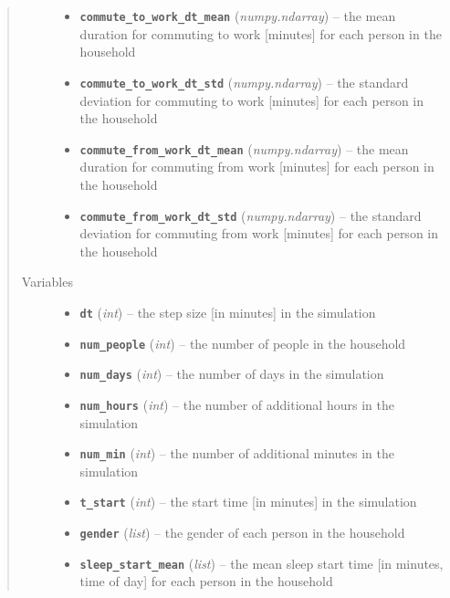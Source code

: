 \documentclass[letterpaper,10pt,english]{sphinxmanual}
\begin{document}
\begin{fulllineitems}
\begin{quote}
\begin{description}
\begin{itemize}
\item {} 
\textbf{\texttt{commute\_to\_work\_dt\_mean}} (\emph{numpy.ndarray}) -- the mean duration for commuting to work {[}minutes{]} for each     person in the household

\item {} 
\textbf{\texttt{commute\_to\_work\_dt\_std}} (\emph{numpy.ndarray}) -- the standard deviation for commuting to work {[}minutes{]} for each     person in the household

\item {} 
\textbf{\texttt{commute\_from\_work\_dt\_mean}} (\emph{numpy.ndarray}) -- the mean duration for commuting from work {[}minutes{]} for each     person in the household

\item {} 
\textbf{\texttt{commute\_from\_work\_dt\_std}} (\emph{numpy.ndarray}) -- the standard deviation for commuting from work {[}minutes{]} for     each person in the household

\end{itemize}

\item[{Variables}] \leavevmode\begin{itemize}
\item {} 
\textbf{\texttt{dt}} (\emph{int}) -- the step size {[}in minutes{]} in the simulation

\item {} 
\textbf{\texttt{num\_people}} (\emph{int}) -- the number of people in the household

\item {} 
\textbf{\texttt{num\_days}} (\emph{int}) -- the number of days in the simulation

\item {} 
\textbf{\texttt{num\_hours}} (\emph{int}) -- the number of additional hours in the simulation

\item {} 
\textbf{\texttt{num\_min}} (\emph{int}) -- the number of additional minutes in the simulation

\item {} 
\textbf{\texttt{t\_start}} (\emph{int}) -- the start time {[}in minutes{]} in the simulation

\item {} 
\textbf{\texttt{gender}} (\emph{list}) -- the gender of each person in the household

\item {} 
\textbf{\texttt{sleep\_start\_mean}} (\emph{list}) -- the mean sleep start time {[}in minutes, time of day{]} for each person in     the household


\end{itemize}
\end{description}
\end{quote}
\end{fulllineitems}
\end{document}
